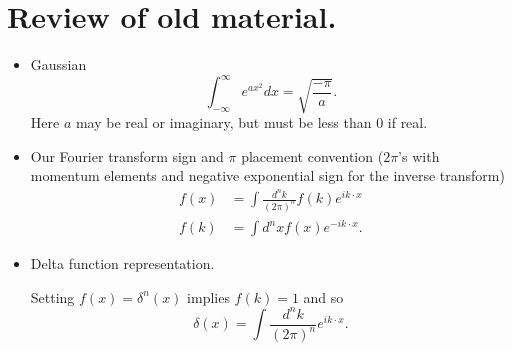 %
%

\section{Review of old material.}

\begin{itemize}
\item Gaussian
\begin{equation}\label{eqn:usefulFormulas:20}
\int_{-\infty}^\infty e^{a x^2} dx = \sqrt{\frac{-\pi}{a}}.
\end{equation}
Here \( a \) may be real or imaginary, but must be less than 0 if real.
\item Our Fourier transform sign and \( \pi \) placement convention (\( 2 \pi\)'s with momentum elements and negative exponential sign for the inverse transform)
\begin{equation}\label{eqn:usefulFormulas:40}
\begin{aligned}
f(x) &= \int \frac{d^n k}{(2 \pi)^n} f(k) e^{i k \cdot x} \\
f(k) &= \int d^n x f(x) e^{-i k \cdot x}.
\end{aligned}
\end{equation}
\item Delta function representation.

Setting \( f(x) = \delta^n(x) \) implies \( f(k) = 1 \) and so
\begin{equation}\label{eqn:usefulFormulas:60}
\delta(x) = \int \frac{d^n k}{(2 \pi)^n} e^{i k \cdot x}.
\end{equation}


\end{itemize}
